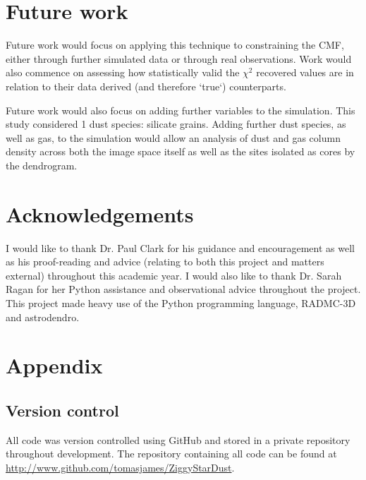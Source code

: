 \documentclass{report}
\begin{document}

\chapter{Future work}
Future work would focus on applying this technique to constraining the CMF, either through further simulated data or through real observations. Work would also commence on assessing how statistically valid the $\chi^{2}$ recovered values are in relation to their data derived (and therefore `true`) counterparts.

Future work would also focus on adding further variables to the simulation. This study considered 1 dust species: silicate grains. Adding further dust species, as well as gas, to the simulation would allow an analysis of dust and gas column density across both the image space itself as well as the sites isolated as cores by the dendrogram.


\chapter*{Acknowledgements}
I would like to thank Dr. Paul Clark for his guidance and encouragement as well as his proof-reading and advice (relating to both this project and matters external) throughout this academic year. I would also like to thank Dr. Sarah Ragan for her Python assistance and observational advice throughout the project. This project made heavy use of the Python programming language, RADMC-3D and astrodendro.


\chapter*{Appendix}

\section*{Version control}
All code was version controlled using GitHub and stored in a private repository throughout development. The repository containing all code can be found at \href{http://www.github.com/tomasjames/ZiggyStarDust}{http://www.github.com/tomasjames/ZiggyStarDust}.
\end{document}
